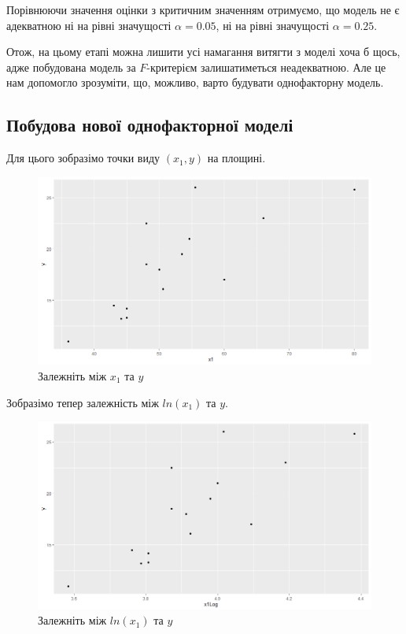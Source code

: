 \documentclass[14pt,a4paper]{scrartcl}
\theoremstyle{definition}
\theoremstyle{remark}
\theoremstyle{definition}
\theoremstyle{definition}
\begin{document}
Порівнюючи значення оцінки з критичним значенням отримуємо, що модель не є адекватною ні на рівні значущості $\alpha = 0.05$, ні на рівні значущості $\alpha = 0.25$.

Отож, на цьому етапі можна лишити усі намагання витягти з моделі хоча б щось, адже побудована модель за $F$-критерієм залишатиметься неадекватною. Але це нам допомогло зрозуміти, що, можливо, варто будувати однофакторну модель.

\subsection{Побудова нової однофакторної моделі}

Для цього зобразімо точки виду $(x_{1}, y)$ на площині.

\begin{figure}[H]
  \includegraphics[width=\linewidth]{Plot_x1_y.png}
  \caption{Залежніть між $x_{1}$ та $y$}
  \label{fig:image5}
\end{figure}

Зобразімо тепер залежність між $ln(x_{1})$ та $y$.

\begin{figure}[H]
  \includegraphics[width=\linewidth]{Plot_x1Log_y.png}
  \caption{Залежніть між $ln(x_{1})$ та $y$}
  \label{fig:image6}
\end{figure}
\end{document}
